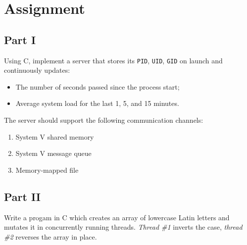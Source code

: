 \documentclass[en, listings]{labreport}
\begin{document}
\maketitlepage

\section*{Assignment}

\subsection*{Part I}

Using C, implement a server that stores its \verb|PID|, \verb|UID|, \verb|GID| on launch
and continuously updates:
\begin{itemize}
\item The number of seconds passed since the process start;
\item Average system load for the last 1, 5, and 15 minutes.
\end{itemize}

The server should support the following communication channels:
\begin{enumerate}
\item System V shared memory
\item System V message queue
\item Memory-mapped file
\end{enumerate}

\subsection*{Part II}

Write a progam in C which creates an array of lowercase Latin letters and
mutates it in concurrently running threads. \textit{Thread \#1} inverts the case,
\textit{thread \#2} reverses the array in place.
\end{document}
